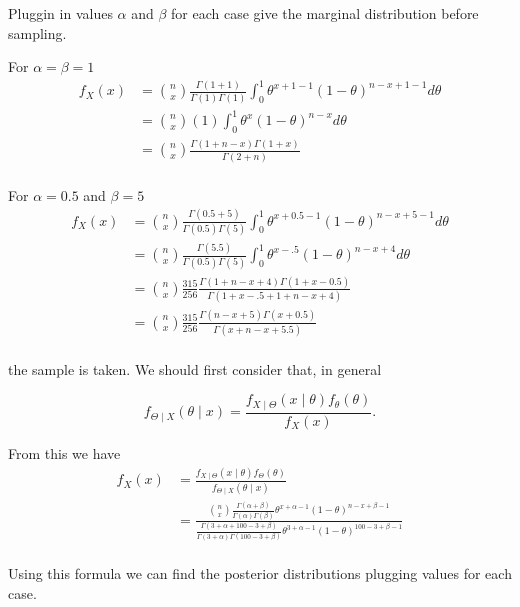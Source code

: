 \documentclass{tufte-book}
\theoremstyle{mytheoremstyle}
\theoremstyle{mylemstyle}
\theoremstyle{mydefstyle}
\begin{document}
\begin{enumerate}
Pluggin in values $\alpha$ and $\beta$ for each case give the marginal distribution before sampling.

For $\alpha=\beta=1$
\begin{align*}
f_X(x) &= \binom{n}{x}\frac{\Gamma(1 + 1)}{\Gamma(1)\Gamma(1)}\int_0^1 \theta^{x+1-1}(1-\theta)^{n-x+1-1}d\theta\\
&=\binom{n}{x}(1)\int_0^1 \theta^{x} (1-\theta)^{n-x}d\theta\\
&=\binom{n}{x}\frac{\Gamma(1+n-x)\Gamma(1+x)}{\Gamma(2+n)}\\
\end{align*}

For $\alpha=0.5$ and $\beta=5$
\begin{align*}
f_X(x) &= \binom{n}{x}\frac{\Gamma(0.5 + 5)}{\Gamma(0.5)\Gamma(5)}\int_0^1 \theta^{x+0.5-1}(1-\theta)^{n-x+5-1}d\theta\\
&=\binom{n}{x}\frac{\Gamma(5.5)}{\Gamma(0.5)\Gamma(5)}\int_0^1 \theta^{x-.5} (1-\theta)^{n-x+4}d\theta\\
&=\binom{n}{x}\frac{315}{256}\frac{\Gamma(1+n-x+4)\Gamma(1+x-0.5)}{\Gamma(1+x-.5+1+n-x+4)}\\
&=\binom{n}{x}\frac{315}{256}\frac{\Gamma(n-x+5)\Gamma(x+0.5)}{\Gamma(x+n-x+5.5)}\\
\end{align*}

 the sample is taken. We should first consider that, in general

\[ f_{\Theta \mid X}(\theta \mid x) = \frac{f_{X \mid \Theta}(x \mid \theta)f_\theta(\theta)}{f_{X}(x)}. \]

From this we have
\begin{align*}
f_X(x) &= \frac{f_{X \mid \Theta}(x \mid \theta)f_\Theta(\theta)}{f_{\Theta \mid X}(\theta \mid x)}\\
&= \frac{\binom{n}{x} \frac{\Gamma(\alpha+\beta)}{\Gamma(\alpha)\Gamma(\beta)}\theta^{x+\alpha-1}(1-\theta)^{n-x+\beta-1}}{ \frac{\Gamma(3+\alpha+100-3+\beta)}{\Gamma(3+\alpha)\Gamma(100-3+\beta)}\theta^{3+\alpha-1}(1-\theta)^{100-3+\beta-1}}\\
\end{align*}

Using this formula we can find the posterior distributions plugging values for each case.


\end{enumerate}
\end{document}
